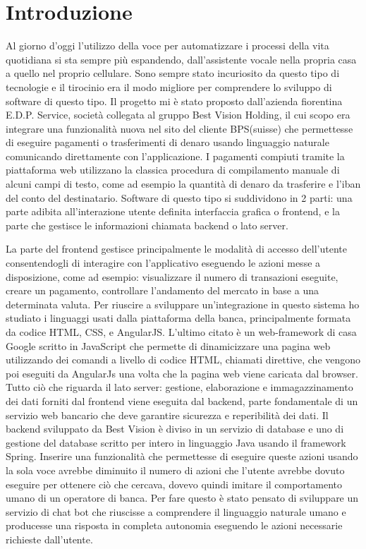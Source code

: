 \chapter{Introduzione}
Al giorno d'oggi l'utilizzo della voce per automatizzare i processi della vita quotidiana si sta sempre più espandendo, dall'assistente vocale nella propria casa a quello nel proprio cellulare. Sono sempre stato incuriosito da questo tipo di tecnologie e il tirocinio era il modo migliore per comprendere lo sviluppo di software di questo tipo. Il progetto mi è stato proposto dall'azienda fiorentina E.D.P. Service, società collegata al gruppo Best Vision Holding, il cui scopo era integrare una funzionalità nuova nel sito del cliente BPS(suisse) che permettesse di eseguire pagamenti o trasferimenti di denaro usando linguaggio naturale comunicando direttamente con l'applicazione.
I pagamenti compiuti tramite la piattaforma web utilizzano la classica procedura di compilamento manuale di alcuni campi di testo, come ad esempio la quantità di denaro da trasferire e l'iban del conto del destinatario.
Software di questo tipo si suddividono in 2 parti: una parte adibita all'interazione utente definita interfaccia grafica o frontend, e la parte che gestisce le informazioni chiamata backend o lato server.
\iffalse
https://it.wikipedia.org/wiki/Front-end\_e\_back-end
\fi
La parte del frontend gestisce principalmente le modalità di accesso dell'utente consentendogli di interagire con l'applicativo eseguendo le azioni messe a disposizione, come ad esempio: visualizzare il numero di transazioni eseguite, creare un pagamento, controllare l'andamento del mercato in base a una determinata valuta.
Per riuscire a sviluppare un'integrazione in questo sistema ho studiato i linguaggi usati dalla piattaforma della banca, principalmente formata da codice HTML, CSS, e AngularJS.
L'ultimo citato è un web-framework di casa Google scritto in JavaScript che permette di dinamicizzare una pagina web utilizzando dei comandi a livello di codice HTML, chiamati direttive, che vengono poi eseguiti da AngularJs una volta che la pagina web viene caricata dal browser.
Tutto ciò che riguarda il lato server: gestione, elaborazione e immagazzinamento dei dati forniti dal frontend viene eseguita dal backend, parte fondamentale di un servizio web bancario che deve garantire sicurezza e reperibilità dei dati. Il backend sviluppato da Best Vision è diviso in un servizio di database e uno di gestione del database scritto per intero in linguaggio Java usando il framework Spring.
Inserire una funzionalità che permettesse di eseguire queste azioni usando la sola voce avrebbe diminuito il numero di azioni che l'utente avrebbe dovuto eseguire per ottenere ciò che cercava, dovevo quindi imitare il comportamento umano di un operatore di banca. Per fare questo è stato pensato di sviluppare un servizio di chat bot che riuscisse a comprendere il linguaggio naturale umano e producesse una risposta in completa autonomia eseguendo le azioni necessarie richieste dall'utente.
